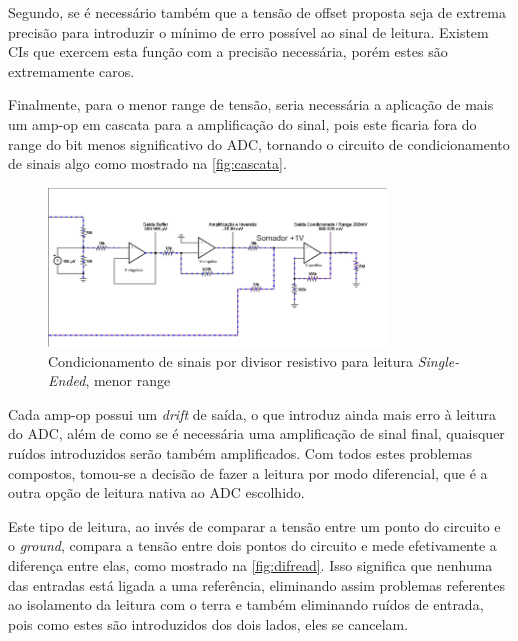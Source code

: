 Segundo, se é necessário também que a tensão de offset proposta seja de extrema precisão para introduzir o mínimo de erro possível ao sinal de leitura. Existem \gls{CI}s que exercem esta função com a precisão necessária, porém estes são extremamente caros.

Finalmente, para o menor range de tensão, seria necessária a aplicação de mais um \gls{amp-op} em cascata para a amplificação do sinal, pois este ficaria fora do range do bit menos significativo do \gls{ADC}, tornando o circuito de condicionamento de sinais algo como mostrado na \autoref{fig:cascata}.

\begin{figure}[htb!]
    \caption{Condicionamento de sinais por divisor resistivo para leitura \textit{Single-Ended}, menor range}
    \label{fig:cascata}
    \includegraphics[width=0.8\textwidth]{figuras/cascata.png}
    \fonte{}
\end{figure}

Cada \gls{amp-op} possui um \textit{drift} de saída, o que introduz ainda mais erro à leitura do \gls{ADC}, além de como se é necessária uma amplificação de sinal final, quaisquer ruídos introduzidos serão também amplificados. Com todos estes problemas compostos, tomou-se a decisão de fazer a leitura por modo diferencial, que é a outra opção de leitura nativa ao \gls{ADC} escolhido.

Este tipo de leitura, ao invés de comparar a tensão entre um ponto do circuito e o \textit{ground}, compara a tensão entre dois pontos do circuito e mede efetivamente a diferença entre elas, como mostrado na \autoref{fig:difread}. Isso significa que nenhuma das entradas está ligada a uma referência, eliminando assim problemas referentes ao isolamento da leitura com o terra e também eliminando ruídos de entrada, pois como estes são introduzidos dos dois lados, eles se cancelam.

